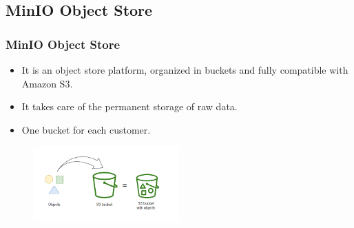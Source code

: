\subsection{MinIO Object Store}
\begin{frame}
	\frametitle{MinIO Object Store}
	
	\begin{itemize}
		\item It is an object store platform, organized in buckets and fully compatible with Amazon S3.
		\item It takes care of the permanent storage of raw data.
		\item One bucket for each customer.
	\end{itemize}
	
	\begin{figure}[h]
		\centering
		\includegraphics[width=0.5\textwidth]{./img/buckets.png}
	\end{figure}
\end{frame}





